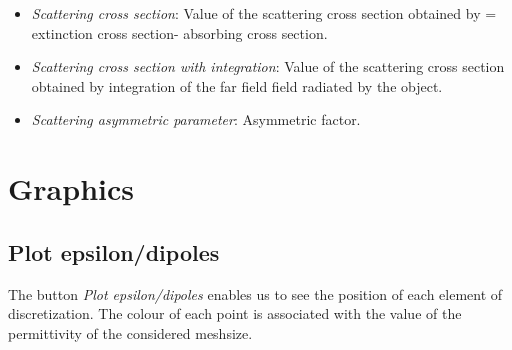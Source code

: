 \begin{itemize}
\item {\it Scattering cross section}: Value of the scattering cross
  section obtained by = extinction cross section- absorbing cross
  section.

\item {\it Scattering cross section with integration}: Value of the
  scattering cross section obtained by integration of the far field
  field radiated by the object.

\item {\it Scattering asymmetric parameter}: Asymmetric factor.









\end{itemize}

\section{Graphics}

\subsection{Plot epsilon/dipoles}

The button {\it Plot epsilon/dipoles} enables us to see the position
of each element of discretization. The colour of each point is
associated with the value of the permittivity of the considered
meshsize.


